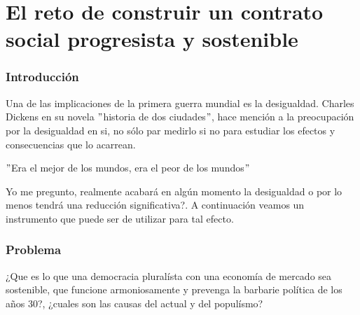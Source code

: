 \chapter*{El reto de construir un contrato social progresista y sostenible}

\begin{multicols}{2}

\subsection*{Introducción}

Una de las implicaciones de la primera guerra mundial es la desigualdad. Charles Dickens en su novela $"$historia de dos ciudades$"$, hace mención a la preocupación por la desigualdad en si, no sólo par medirlo si no para estudiar los efectos y consecuencias que lo acarrean.
\begin{center} $"$Era el mejor de los mundos, era el peor de los mundos$"$ \end{center}
Yo me pregunto, realmente acabará en algún momento la desigualdad o por lo menos tendrá una reducción significativa?. A continuación veamos un instrumento que puede ser de utilizar para tal efecto.

\subsection*{Problema}

\begin{center}¿Que es lo que una democracia pluralísta con una economía de mercado sea sostenible, que funcione armoniosamente y prevenga la barbarie política de los años 30?, ¿cuales son las causas del actual y del populísmo?\end{center}


\end{multicols}
